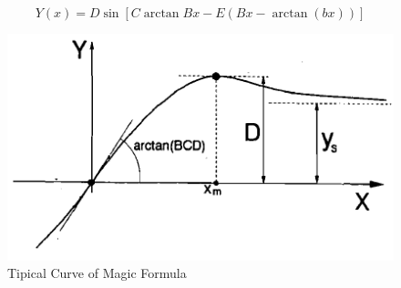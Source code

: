 { \begin{equation}\label{eqn:magic}
 Y(x)=D\sin[C \arctan{Bx -E(Bx-\arctan(bx))}]
 \end{equation}
\begin{figure}
	\label{fig:magicformula}
	\includegraphics{Chapter3/fig/magicformula}
	\caption{Tipical Curve of Magic Formula \cite{pacejka1992magic}}
\end{figure}

}
